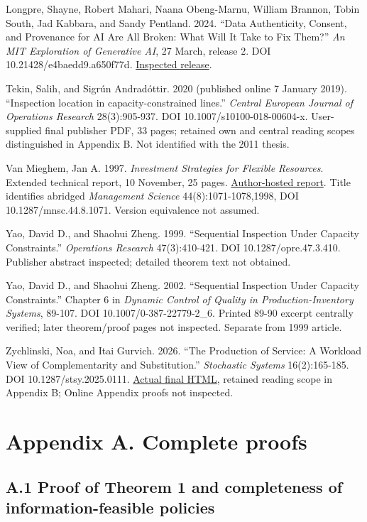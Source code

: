 \documentclass[
  11pt,
  a4paper,
]{article}
\begin{document}
{Longpre, Shayne, Robert Mahari, Naana Obeng-Marnu, William Brannon,
Tobin South, Jad Kabbara, and Sandy Pentland. 2024. ``Data Authenticity,
Consent, and Provenance for AI Are All Broken: What Will It Take to Fix
Them?'' \emph{An MIT Exploration of Generative AI}, 27 March, release 2.
DOI 10.21428/e4baedd9.a650f77d.
\href{https://mit-genai.pubpub.org/pub/uk7op8zs/release/2}{Inspected
release}.

Tekin, Salih, and Sigrún Andradóttir. 2020 (published online 7 January
2019). ``Inspection location in capacity-constrained lines.''
\emph{Central European Journal of Operations Research} 28(3):905-937.
DOI 10.1007/s10100-018-00604-x. User-supplied final publisher PDF, 33
pages; retained own and central reading scopes distinguished in Appendix
B. Not identified with the 2011 thesis.

Van Mieghem, Jan A. 1997. \emph{Investment Strategies for Flexible
Resources}. Extended technical report, 10 November, 25 pages.
\href{https://www.kellogg.northwestern.edu/faculty/vanmieghem/htm/flextec0.pdf}{Author-hosted
report}. Title identifies abridged \emph{Management Science}
44(8):1071-1078,1998, DOI 10.1287/mnsc.44.8.1071. Version equivalence
not assumed.

Yao, David D., and Shaohui Zheng. 1999. ``Sequential Inspection Under
Capacity Constraints.'' \emph{Operations Research} 47(3):410-421. DOI
10.1287/opre.47.3.410. Publisher abstract inspected; detailed theorem
text not obtained.

Yao, David D., and Shaohui Zheng. 2002. ``Sequential Inspection Under
Capacity Constraints.'' Chapter 6 in \emph{Dynamic Control of Quality in
Production-Inventory Systems}, 89-107. DOI 10.1007/0-387-22779-2\_6.
Printed 89-90 excerpt centrally verified; later theorem/proof pages not
inspected. Separate from 1999 article.

Zychlinski, Noa, and Itai Gurvich. 2026. ``The Production of Service: A
Workload View of Complementarity and Substitution.'' \emph{Stochastic
Systems} 16(2):165-185. DOI 10.1287/stsy.2025.0111.
\href{https://pubsonline.informs.org/doi/full/10.1287/stsy.2025.0111}{Actual
final HTML}, retained reading scope in Appendix B; Online Appendix
proofs not inspected.

}
\clearpage
\section{Appendix A. Complete
proofs}\label{appendix-a.-complete-proofs}

\subsection{A.1 Proof of Theorem 1 and completeness of
information-feasible
policies}\label{a.1-proof-of-theorem-1-and-completeness-of-information-feasible-policies}
\end{document}
